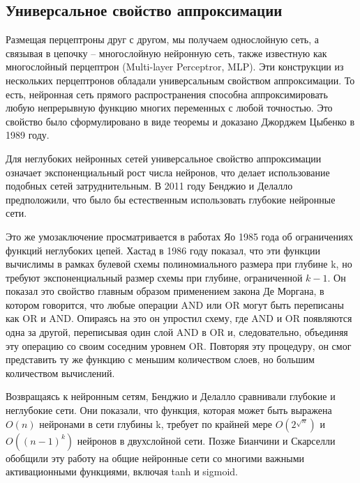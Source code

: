 \subsection{Универсальное свойство аппроксимации}
Размещая перцептроны друг с другом, мы получаем однослойную сеть, а связывая в
цепочку – многослойную нейронную сеть, также известную как многослойный
перцептрон (Multi-layer Perceptror, MLP). Эти конструкции из нескольких
перцептронов обладали универсальным свойством аппроксимации. То есть, нейронная
сеть прямого распространения способна аппроксимировать любую непрерывную функцию
многих переменных с любой точностью. Это свойство было сформулировано в виде
теоремы и доказано  Джорджем Цыбенко в 1989 году\cite{cyb}.
\par
Для неглубоких нейронных сетей универсальное свойство аппроксимации означает
экспоненциальный рост числа нейронов, что делает использование подобных сетей
затруднительным. В 2011 году Бенджио и Делалло предположили, что было
бы естественным использовать глубокие нейронные сети.
\par
Это же умозаключение просматривается в работах Яо 1985\cite{Yao1985} года об
ограничениях функций неглубоких цепей. Хастад в 1986\cite{Hastad2014} году
показал, что эти функции вычислимы в рамках булевой схемы полиномиального размера
при глубине k, но требуют экспоненциальный размер схемы при глубине,
ограниченной $k-1$. Он показал это свойство главным образом применением закона
Де Моргана, в котором говорится, что любые операции AND или OR могут быть
переписаны как OR и AND. Опираясь на это он упростил схему, где AND и OR
появляются одна за другой, переписывая один слой AND в OR и, следовательно,
объединяя эту операцию со своим соседним уровнем OR. Повторяя эту процедуру,
он смог представить ту же функцию с меньшим количеством слоев, но большим
количеством вычислений.
\par
Возвращаясь к нейронным сетям, Бенджио и Делалло\cite{Delalleau} сравнивали
глубокие и неглубокие сети. Они показали, что функция, которая может быть
выражена $O(n)$ нейронами в сети глубины k, требует по крайней мере
$O(2^{\sqrt{n}})$ и $O((n-1)^k)$ нейронов в двухслойной сети. Позже Бианчини и
Скарселли обобщили эту работу на общие нейронные сети со многими важными
активационными функциями, включая tanh и sigmoid.

